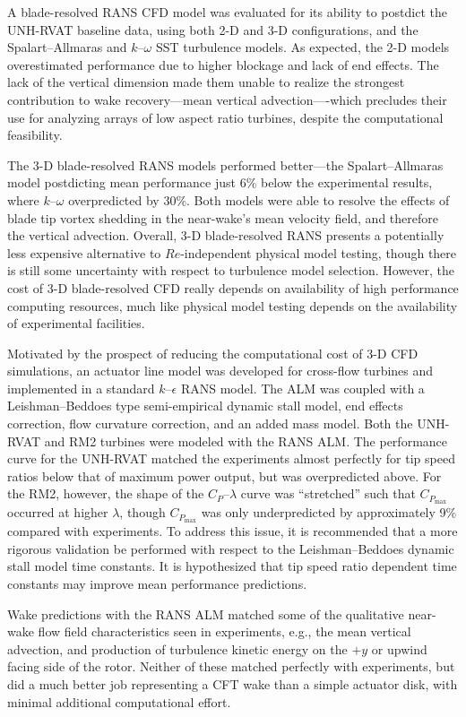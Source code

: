 A blade-resolved RANS CFD model was evaluated for its ability to postdict the
UNH-RVAT baseline data, using both 2-D and 3-D configurations, and the
Spalart--Allmaras and $k$--$\omega$ SST turbulence models. As expected, the 2-D
models overestimated performance due to higher blockage and lack of end effects.
The lack of the vertical dimension made them unable to realize the strongest
contribution to wake recovery---mean vertical advection----which precludes their
use for analyzing arrays of low aspect ratio turbines, despite the computational
feasibility.

The 3-D blade-resolved RANS models performed better---the Spalart--Allmaras
model postdicting mean performance just 6\% below the experimental results,
where $k$--$\omega$ overpredicted by 30\%. Both models were able to resolve the
effects of blade tip vortex shedding in the near-wake's mean velocity field, and
therefore the vertical advection. Overall, 3-D blade-resolved RANS presents a
potentially less expensive alternative to $Re$-independent physical model
testing, though there is still some uncertainty with respect to turbulence model
selection. However, the cost of 3-D blade-resolved CFD really depends on
availability of high performance computing resources, much like physical model
testing depends on the availability of experimental facilities.

Motivated by the prospect of reducing the computational cost of 3-D CFD
simulations, an actuator line model was developed for cross-flow turbines and
implemented in a standard $k$--$\epsilon$ RANS model. The ALM was coupled with a
Leishman--Beddoes type semi-empirical dynamic stall model, end effects
correction, flow curvature correction, and an added mass model. Both the
UNH-RVAT and RM2 turbines were modeled with the RANS ALM. The performance curve
for the UNH-RVAT matched the experiments almost perfectly for tip speed ratios
below that of maximum power output, but was overpredicted above. For the RM2,
however, the shape of the $C_P$--$\lambda$ curve was ``stretched'' such that
$C_{P_{\max}}$ occurred at higher $\lambda$, though $C_{P_{\max}}$ was only
underpredicted by approximately 9\% compared with experiments. To address this
issue, it is recommended that a more rigorous validation be performed with
respect to the Leishman--Beddoes dynamic stall model time constants. It is
hypothesized that tip speed ratio dependent time constants may improve mean
performance predictions.

Wake predictions with the RANS ALM matched some of the qualitative near-wake
flow field characteristics seen in experiments, e.g., the mean vertical
advection, and production of turbulence kinetic energy on the $+y$ or upwind
facing side of the rotor. Neither of these matched perfectly with experiments,
but did a much better job representing a CFT wake than a simple actuator disk,
with minimal additional computational effort.

